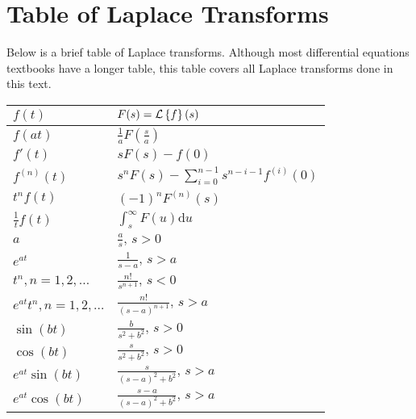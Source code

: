 \section{Table of Laplace Transforms}
\noindent
Below is a brief table of Laplace transforms. Although most differential equations textbooks have a longer table, this table covers all Laplace transforms done in this text.
\renewcommand{\arraystretch}{1.75}
\begin{table}[H]
	\centering
	\begin{tabular}{ l | l }
		$f(t)$  & $F(s) = \mathcal{L}\left\{ f \right\}\left(s\right)$	\\
		\hline
		$f(at)$ & $\frac{1}{a}F\left(\frac{s}{a}\right)$	\\
		$f'(t)$ & $sF(s) - f(0)$	\\
		$f^{(n)}(t)$ & $s^nF(s) - \sum_{i=0}^{n-1}{s^{n-i-1}f^{(i)}}(0)$	\\
		$t^nf(t)$ & $(-1)^nF^{(n)}(s)$	\\
		$\frac{1}{t}f(t)$ & $\int_s^\infty{F(u) \mathrm{d}u}$	\\
		$a$ & $\frac{a}{s}\text{, } s > 0$ \\
		$e^{at}$ & $\frac{1}{s-a}\text{, } s > a$	\\
		$t^n, n = 1,2,\ldots$ & $\frac{n!}{s^{n+1}}\text{, } s < 0$	\\
		$e^{at}t^n, n = 1,2,\ldots$ & $\frac{n!}{(s-a)^{n+1}}\text{, } s > a$	\\
		$\sin{(bt)}$ & $\frac{b}{s^2 + b^2}\text{, } s > 0$ \\
		$\cos{(bt)}$ & $\frac{s}{s^2 + b^2}\text{, } s > 0$ \\
		$e^{at}\sin{(bt)}$ & $\frac{s}{(s-a)^2 + b^2}\text{, } s > a$ \\
		$e^{at}\cos{(bt)}$ & $\frac{s-a}{(s-a)^2 + b^2}\text{, } s > a$ \\
	\end{tabular}
\end{table}